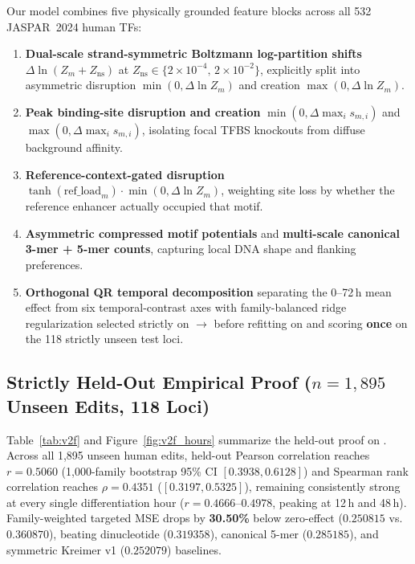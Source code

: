 \documentclass[10.5pt,a4paper]{article}
\begin{document}
Our  model combines five physically grounded feature blocks across all 532 JASPAR~2024 human TFs:
\begin{enumerate}
\item \textbf{Dual-scale strand-symmetric Boltzmann log-partition shifts} $\Delta\ln(Z_m + Z_{\mathrm{ns}})$ at $Z_{\mathrm{ns}}\in\{2\times10^{-4},\, 2\times10^{-2}\}$, explicitly split into asymmetric disruption $\min(0,\Delta\ln Z_m)$ and creation $\max(0,\Delta\ln Z_m)$.
\item \textbf{Peak binding-site disruption and creation} $\min(0,\Delta\max_i s_{m,i})$ and $\max(0,\Delta\max_i s_{m,i})$, isolating focal TFBS knockouts from diffuse background affinity.
\item \textbf{Reference-context-gated disruption} $\tanh(\text{ref\_load}_m)\cdot \min(0,\Delta\ln Z_m)$, weighting site loss by whether the reference enhancer actually occupied that motif.
\item \textbf{Asymmetric compressed motif potentials} and \textbf{multi-scale canonical 3-mer + 5-mer counts}, capturing local DNA shape and flanking preferences.
\item \textbf{Orthogonal QR temporal decomposition} separating the 0--72\,h mean effect from six temporal-contrast axes with family-balanced ridge regularization selected strictly on $\to$ before refitting on  and scoring \textbf{once} on the 118 strictly unseen test loci.
\end{enumerate}

\subsection{Strictly Held-Out Empirical Proof ($n=1{,}895$ Unseen Edits, 118 Loci)}

Table~\ref{tab:v2f} and Figure~\ref{fig:v2f_hours} summarize the held-out proof on . Across all 1,895 unseen human edits, held-out Pearson correlation reaches \textbf{$r=0.5060$} (1,000-family bootstrap 95\% CI $[0.3938, 0.6128]$) and Spearman rank correlation reaches \textbf{$\rho=0.4351$} ($[0.3197, 0.5325]$), remaining consistently strong at every single differentiation hour ($r=0.4666$--$0.4978$, peaking at 12\,h and 48\,h). Family-weighted targeted MSE drops by \textbf{30.50\%} below zero-effect ($0.250815$ vs.\ $0.360870$), beating dinucleotide ($0.319358$), canonical 5-mer ($0.285185$), and symmetric Kreimer v1 ($0.252079$) baselines.
\end{document}
